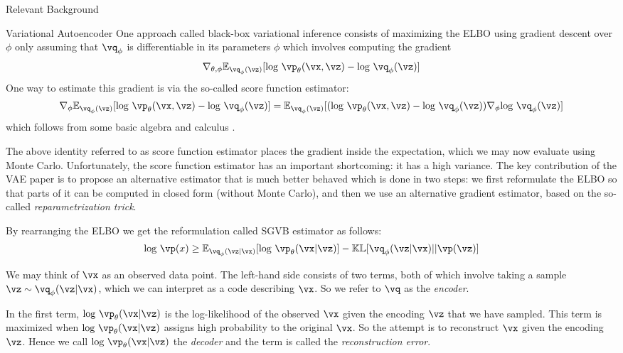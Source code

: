 \documentclass{article}
\begin{document}
\begin{psection}{Relevant Background}
\begin{psubsection}{Variational Autoencoder}
    One approach called black-box variational inference consists of maximizing the ELBO using gradient descent over $\phi$ only assuming that $\vq_\phi$ is differentiable in its parameters $\phi$ which involves computing the gradient
    \begin{align*}
        \nabla_{\theta,\phi} \mathbb{E}_{\vq_\phi(\vz)}[\text{log } \vp_\theta(\vx,\vz)-\text{log } \vq_\phi(\vz)]
    \end{align*}
    One way to estimate this gradient is via the so-called score function estimator:
    \begin{align*}
        \nabla_{\phi} \mathbb{E}_{\vq_\phi(\vz)}[\text{log } \vp_\theta(\vx,\vz)-\text{log } \vq_\phi(\vz)] =
        \mathbb{E}_{\vq_\phi(\vz)}[(\text{log } \vp_\theta(\vx,\vz)-\text{log } \vq_\phi(\vz))\nabla_{\phi}\text{log } \vq_\phi(\vz)]
    \end{align*}
    which follows from some basic algebra and calculus \citep{Mnih}.
    
    The above identity referred to as score function estimator places the gradient inside the expectation, which we may now evaluate using Monte Carlo. Unfortunately, the score function estimator has an important shortcoming: it has a high variance. The key contribution of the VAE paper \citep{VAE} is to propose an alternative estimator that is much better behaved which is done in two steps: we first reformulate the ELBO so that parts of it can be computed in closed form (without Monte Carlo), and then we use an alternative gradient estimator, based on the so-called \textit{reparametrization trick}.
    
    By rearranging the ELBO we get the reformulation called SGVB estimator as follows:
    \begin{align*}
        \text{log } \vp(x) \geq \mathbb{E}_{\vq_\phi(\vz|\vx)}[\text{log } \vp_\theta(\vx|\vz)]-\mathbb{KL}[\vq_\phi(\vz|\vx)||\vp(\vz)]
    \end{align*}
    
    We may think of $\vx$ as an observed data point. The left-hand side consists of two terms, both of which involve taking a sample $\vz \sim \vq_\phi(\vz|\vx)$, which we can interpret as a code describing $\vx$. So we refer to $\vq$ as the \textit{encoder}.
    
    In the first term, $\text{log } \vp_\theta(\vx|\vz)$ is the log-likelihood of the observed $\vx$ given the encoding $\vz$ that we have sampled. This term is maximized when $\text{log } \vp_\theta(\vx|\vz)$ assigns high probability to the original $\vx$. So the attempt is to reconstruct $\vx$ given the encoding $\vz$. Hence we call $\text{log } \vp_\theta(\vx|\vz)$ the \textit{decoder} and the term is called the \textit{reconstruction error}.
    

\end{psubsection}
\end{psection}
\end{document}
